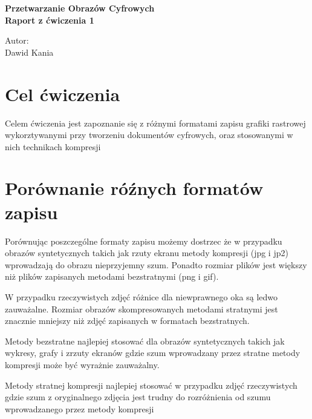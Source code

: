 \documentclass{report}
\begin{document}
\begin{titlepage}
    \begin{center}
        \Huge
        \textbf{Przetwarzanie Obrazów Cyfrowych}
        \\ \vspace{1.5cm}
        \Large
        \textbf{Raport z ćwiczenia 1}        
    \end{center}
    \vspace{4.0cm}
    \Large
    Autor: \\
    Dawid Kania
    
\end{titlepage}


\section{Cel ćwiczenia}

Celem ćwiczenia jest zapoznanie się z różnymi formatami 
zapisu grafiki rastrowej wykorztywanymi przy tworzeniu dokumentów
cyfrowych, oraz stosowanymi w nich technikach kompresji


\section{Porównanie róźnych formatów zapisu}


Porównując poszczególne formaty zapisu możemy dostrzec że
w przypadku obrazów syntetycznych takich jak rzuty ekranu
metody kompresji (jpg i jp2) wprowadzają do obrazu nieprzyjemny szum. 
Ponadto rozmiar plików jest większy niż plików zapisanych metodami bezstratnymi (png i gif).

W przypadku rzeczywistych zdjęć różnice dla niewprawnego oka są
ledwo zauważalne. Rozmiar obrazów skompresowanych metodami stratnymi jest znacznie mniejszy
niż zdjęć zapisanych w formatach bezstratnych.

Metody bezstratne najlepiej stosować dla obrazów syntetycznych takich jak
wykresy, grafy i zrzuty ekranów gdzie szum wprowadzany przez stratne metody 
kompresji może być wyrażnie zauważalny.

Metody stratnej kompresji najlepiej stosować w przypadku zdjęć rzeczywistych
gdzie szum z oryginalnego zdjęcia jest trudny do rozróżnienia od szumu wprowadzanego
przez metody kompresji










\newcommand{\ww}{0.32}
\end{document}
